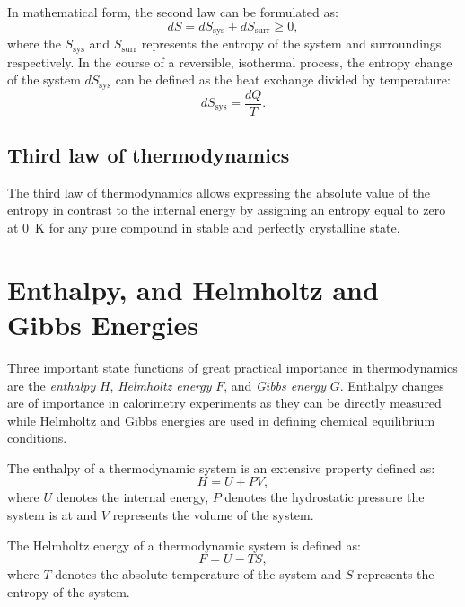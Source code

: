 In mathematical form, the second law can be formulated as:
\begin{equation}\label{eqn:slot}
    dS = dS_\text{sys} + dS_\text{surr} \geq 0,
\end{equation}
where the $S_\text{sys}$ and $S_\text{surr}$ represents the entropy of the system and surroundings respectively.
In the course of a reversible, isothermal process, the entropy change of the system $dS_\text{sys}$   can be defined as the heat exchange divided by temperature:
\begin{equation}\label{eqn:slotrev}
    dS_\text{sys} = \frac{dQ}{T}.
\end{equation}

\subsection{Third law of thermodynamics}
The third law of thermodynamics allows expressing the absolute value of the entropy in contrast to the internal energy by assigning an entropy equal to zero at \SI{0}{\kelvin} for any pure compound in stable and perfectly crystalline state.

\section{Enthalpy, and Helmholtz and Gibbs Energies}
    Three important state functions of great practical importance in thermodynamics are the \emph{enthalpy} $H$, \emph{Helmholtz energy} $F$, and \emph{Gibbs energy} $G$. Enthalpy changes are of importance in calorimetry experiments as they can be directly measured while Helmholtz and Gibbs energies are used in defining chemical equilibrium conditions.

    The enthalpy of a thermodynamic system is an extensive property defined as:
    \begin{equation}
        H = U + PV,
    \end{equation}
    where $U$ denotes the internal energy, $P$ denotes the hydrostatic pressure the system is at and $V$ represents the volume of the system.

    The Helmholtz energy of a thermodynamic system is defined as:
    \begin{equation}
        F = U - TS,
    \end{equation}
    where $T$ denotes the absolute temperature of the system and $S$ represents the entropy of the system.

